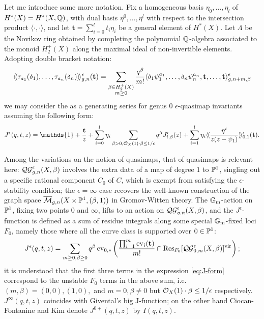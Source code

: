 Let me introduce some more notation. Fix a homogeneous basis $\eta_0,\ldots,\eta_l$ of $H^*(X)=H^*(X,\mathbb{Q})$, with dual basis $\eta^0,\ldots,\eta^l$ with respect to the intersection product $\langle\cdot,\cdot\rangle$, and let $\mathbf{t}=\sum_{i=0}^lt_i\eta_i$ be a general element of $H^*(X)$. Let $\Lambda$ be the Novikov ring obtained by completing the polynomial $\mathbb{Q}$-algebra associated to the monoid $ H_2^+(X)$ along the maximal ideal of non-invertible elements. Adopting double bracket notation:
\[\langle\!\langle\tau_{a_1}(\delta_1),\ldots,\tau_{a_n}(\delta_n)\rangle\!\rangle^\epsilon_{g,n}(\mathbf{t})=\sum_{\substack{\beta\in H_2^+(X) \\ m\geq 0}}\frac{q^\beta}{m!}\langle \delta_1\psi_1^{a_1},\ldots,\delta_n\psi_n^{a_n},\mathbf t,\ldots,\mathbf t\rangle^{\epsilon}_{g,n+m,\beta} \]
we may consider the  as a generating series for genus $0$ $\epsilon$-quasimap invariants assuming the following form:
\begin{equation}\label{eq:J-form} J^\epsilon(q,t,z)=\mathds{1}+\frac{\mathbf{t}}{z}+\sum_{i=0}^l\eta_i\sum_{\beta> 0,\OO_X(1)\cdot\beta\leq 1/\epsilon}q^\beta J^\epsilon_{i,\beta}(z)+\sum_{i=1}^l\eta_i\lala\frac{\eta^i}{z(z-\psi_1)}\rara^\epsilon_{0,1}(\mathbf{t}).\end{equation}
\begin{rmk} Among the variations on the notion of quasimaps, that of  quasimaps is relevant here:
$\mathcal{QG}^{\epsilon}_{g,n}(X,\beta)$ involves the extra data of a map of degree $1$ to $\mathbb P^1$, singling out a specific rational component $C_0$ of $C$, which is exempt from satisfying the $\epsilon$-stability condition; the $\epsilon=\infty$ case recovers the well-known construction of the graph space $\overline{\mathcal{M}}_{g,n}(X\times\mathbb P^1,(\beta,1))$ in Gromov-Witten theory. The $\mathbb{G}_{\text{m}}$-action on $\mathbb P^1$, fixing two points $0$ and $\infty$, lifts to an action on $\mathcal{QG}^{\epsilon}_{g,n}(X,\beta)$, and the $J^\epsilon$-function is defined as a sum of residue integrals along some special $\mathbb{G}_{\text{m}}$-fixed loci $F_0$, namely those where all the curve class is supported over $0\in\mathbb P^1$:
\[J^\epsilon(q,t,z)=\sum_{m\geq0,\beta\geq0}q^\beta \operatorname{ev}_{0,*}\left(\frac{\prod_{i=1}^m \operatorname{ev}_i(\mathbf{t})}{m!}\cap\operatorname{Res}_{F_0}[\mathcal{QG}^{\epsilon}_{0,m}(X,\beta)]^{\mathrm{vir}}\right);\]
it is understood that the first three terms in the expression \eqref{eq:J-form} correspond to the unstable $F_0$ terms in the above sum, i.e. $(m,\beta)=(0,0), (1,0),$ and $m=0,\beta\neq 0$ but $\mathcal{O}_X(1)\cdot\beta\leq 1/\epsilon$ respectively. $J^\infty(q,t,z)$ coincides with Givental's big J-function; on the other hand Ciocan-Fontanine and Kim denote $J^{0+}(q,t,z)$ by $I(q,t,z)$. \end{rmk}

